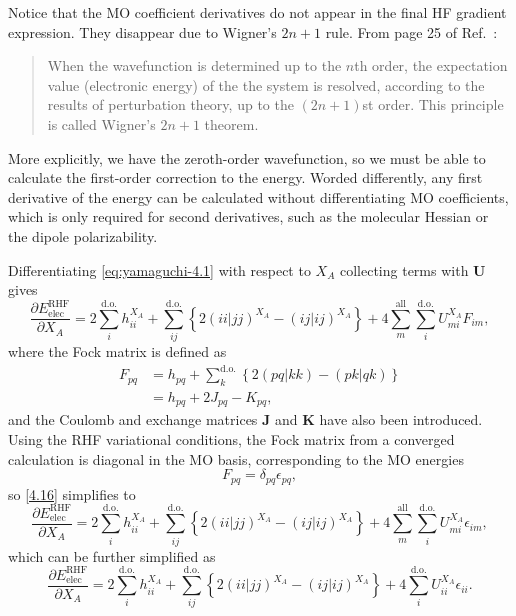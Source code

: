 \documentclass[%
class = book,%
crop = false,%
float = true,%
multi = true,%
preview = false,%
]{standalone}
\begin{document}
Notice that the MO coefficient derivatives do not appear in the final HF gradient expression. They disappear due to Wigner's \(2n + 1\) rule. From page 25 of Ref.~\parencite{Yamaguchi1994}:
\begin{quote}
  When the wavefunction is determined up to the \(n\)th order, the expectation value (electronic energy) of the the system is resolved, according to the results of perturbation theory, up to the \((2n+1)\)st order. This principle is called Wigner's \(2n+1\) theorem\cite{doi:10.1063/1.1668053,EPSTEIN1980311}.
\end{quote}
More explicitly, we have the zeroth-order wavefunction, so we must be able to calculate the first-order correction to the energy. Worded differently, any first derivative of the energy can be calculated without differentiating MO coefficients, which is only required for second derivatives, such as the molecular Hessian or the dipole polarizability.

Differentiating \eqref{eq:yamaguchi-4.1} with respect to \(X_{A}\) collecting terms with \(\mathbf{U}\) gives
\begin{equation}
  \label{4.16}\tag{Yamaguchi eq. 4.16}
  \frac{\partial E_{\text{elec}}^{\text{RHF}}}{\partial X_{A}} = 2 \sum_{i}^{\text{d.o.}} h_{ii}^{X_{A}} + \sum_{ij}^{\text{d.o.}} \left\{ 2(ii|jj)^{X_{A}} - (ij|ij)^{X_{A}} \right\} + 4 \sum_{m}^{\text{all}} \sum_{i}^{\text{d.o.}} U_{mi}^{X_{A}} F_{im},
\end{equation}
where the Fock matrix is defined as
\begin{equation}
  \label{eq:yamaguchi-4.6} \tag{Yamaguchi eq. 4.6}
  \begin{aligned}
    F_{pq} &= h_{pq} + \sum_{k}^{\text{d.o.}} \left\{ 2(pq|kk) - (pk|qk) \right\} \\
    &= h_{pq} + 2J_{pq} - K_{pq},
  \end{aligned}
\end{equation}
and the Coulomb and exchange matrices \(\mathbf{J}\) and \(\mathbf{K}\) have also been introduced. Using the RHF variational conditions, the Fock matrix from a converged calculation is diagonal in the MO basis, corresponding to the MO energies
\begin{equation}
  F_{pq} = \delta_{pq} \epsilon_{pq}, \tag{Yamaguchi eq. 4.7}
\end{equation}
so \eqref{4.16} simplifies to
\begin{equation}
  \frac{\partial E_{\text{elec}}^{\text{RHF}}}{\partial X_{A}} = 2 \sum_{i}^{\text{d.o.}} h_{ii}^{X_{A}} + \sum_{ij}^{\text{d.o.}} \left\{ 2(ii|jj)^{X_{A}} - (ij|ij)^{X_{A}} \right\} + 4 \sum_{m}^{\text{all}} \sum_{i}^{\text{d.o.}} U_{mi}^{X_{A}} \epsilon_{im}, \tag{Yamaguchi eq. 4.17 modified}
\end{equation}
which can be further simplified as
\begin{equation}
  \frac{\partial E_{\text{elec}}^{\text{RHF}}}{\partial X_{A}} = 2 \sum_{i}^{\text{d.o.}} h_{ii}^{X_{A}} + \sum_{ij}^{\text{d.o.}} \left\{ 2(ii|jj)^{X_{A}} - (ij|ij)^{X_{A}} \right\} + 4 \sum_{i}^{\text{d.o.}} U_{ii}^{X_{A}} \epsilon_{ii}. \tag{Yamaguchi eq. 4.17}
\end{equation}
\end{document}
